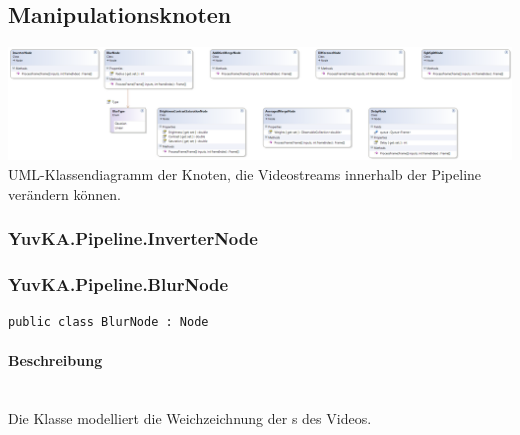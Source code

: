 \subsection{Manipulationsknoten}

\includegraphics[width=\textwidth]{YuvKA.Pipeline/manipulationnodes.png}
UML-Klassendiagramm der Knoten, die Videostreams innerhalb der Pipeline verändern können.

\subsubsection{YuvKA.Pipeline.InverterNode}

\subsubsection{YuvKA.Pipeline.BlurNode}

\begin{verbatim}
public class BlurNode : Node
\end{verbatim}

\paragraph{Beschreibung}~\\
Die Klasse  modelliert die Weichzeichnung der s des Videos.


